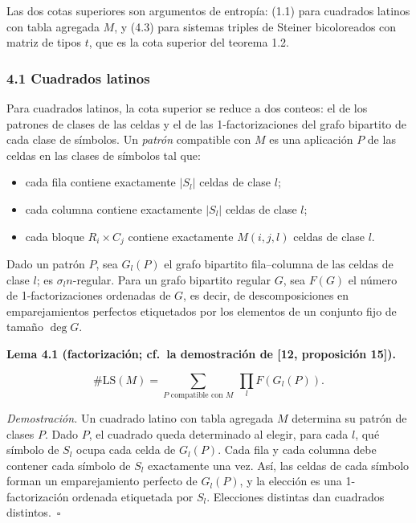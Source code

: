 \documentclass[spanish,11pt,a4paper]{article}
\providecommand{\tightlist}{\setlength{\itemsep}{0pt}\setlength{\parskip}{0pt}}
\begin{document}
Las dos cotas superiores son argumentos de entropía: (1.1) para cuadrados latinos con tabla agregada \(M\), y (4.3) para sistemas triples de Steiner bicoloreados con matriz de tipos \(t\), que es la cota superior del teorema 1.2.

\subsubsection{4.1 Cuadrados latinos}\label{cuadrados-latinos}

Para cuadrados latinos, la cota superior se reduce a dos conteos: el de los patrones de clases de las celdas y el de las 1-factorizaciones del grafo bipartito de cada clase de símbolos. Un \emph{patrón} compatible con \(M\) es una aplicación \(P\) de las celdas en las clases de símbolos tal que:

\begin{itemize}
\tightlist
\item
  cada fila contiene exactamente \(|S_l|\) celdas de clase \(l\);
\item
  cada columna contiene exactamente \(|S_l|\) celdas de clase \(l\);
\item
  cada bloque \(R_i\times C_j\) contiene exactamente \(M(i,j,l)\) celdas de clase \(l\).
\end{itemize}

Dado un patrón \(P\), sea \(G_l(P)\) el grafo bipartito fila--columna de las celdas de clase \(l\); es \(\sigma_l n\)-regular. Para un grafo bipartito regular \(G\), sea \(F(G)\) el número de 1-factorizaciones ordenadas de \(G\), es decir, de descomposiciones en emparejamientos perfectos etiquetados por los elementos de un conjunto fijo de tamaño \(\deg G\).

\textbf{Lema 4.1 (factorización; cf.~la demostración de {[}12, proposición 15{]}).}

\nopagebreak[4]
\[\#\mathrm{LS}(M)=\sum_{P\text{ compatible con }M}\ \prod_l F(G_l(P)).\]

\emph{Demostración.} Un cuadrado latino con tabla agregada \(M\) determina su patrón de clases \(P\). Dado \(P\), el cuadrado queda determinado al elegir, para cada \(l\), qué símbolo de \(S_l\) ocupa cada celda de \(G_l(P)\). Cada fila y cada columna debe contener cada símbolo de \(S_l\) exactamente una vez. Así, las celdas de cada símbolo forman un emparejamiento perfecto de \(G_l(P)\), y la elección es una 1-factorización ordenada etiquetada por \(S_l\). Elecciones distintas dan cuadrados distintos.~\(\square\)
\end{document}
